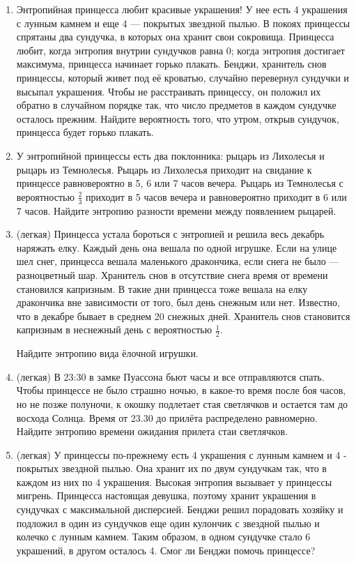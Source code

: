 \documentclass[a4paper,12pt]{article}
\begin{document}
\begin{enumerate} %
\item  %
Энтропийная принцесса любит красивые украшения! У нее есть 4 украшения с лунным камнем и еще 4 — покрытых звездной пылью.
В покоях принцессы спрятаны два сундучка, в которых она хранит свои сокровища.
Принцесса любит, когда энтропия внутрии сундучков равна 0;
когда энтропия достигает максимума, принцесса начинает горько плакать.
Бенджи, хранитель снов принцессы, который живет под её кроватью, случайно перевернул сундучки и высыпал украшения. Чтобы не расстраивать принцессу, он положил их обратно в случайном порядке так, что число предметов в каждом сундучке осталось прежним. Найдите вероятность того, что утром, открыв сундучок, принцесса будет горько плакать.
\item
У энтропийной принцессы есть два поклонника: рыцарь из Лихолесья и  рыцарь из Темнолесья. Рыцарь из Лихолесья приходит на свидание к принцессе равновероятно в 5, 6 или 7 часов вечера. Рыцарь из Темнолесья с вероятностью $\frac{2}{3}$ приходит в 5 часов вечера и равновероятно приходит в 6 или 7 часов. Найдите энтропию разности времени между появлением рыцарей.

\item (легкая)
Принцесса устала бороться с энтропией и решила весь декабрь наряжать елку.
Каждый день она вешала по одной игрушке.
Если на улице шел снег, принцесса вешала маленького дракончика, если снега не было — разноцветный шар.
Хранитель снов в отсутствие снега время от времени становился капризным.
В такие дни принцесса тоже вешала на елку дракончика вне зависимости от того, был день снежным или нет.
Известно, что в декабре бывает в среднем 20 снежных дней.
Хранитель снов становится капризным в неснежный день с вероятностью $\frac{1}{2}$.

Найдите энтропию вида ёлочной игрушки.
\item (легкая)
В 23:30 в замке Пуассона бьют часы и все отправляются спать.
Чтобы принцессе не было страшно ночью, в какое-то время после боя часов, но не позже полуночи,
к окошку подлетает стая светлячков и остается там до восхода Солнца. Время от 23.30 до прилёта распределено равномерно.
Найдите энтропию времени ожидания прилета стаи светлячков.

\item (легкая)
У принцессы по-прежнему есть  4 украшения с лунным камнем и 4 - покрытых звездной пылью. Она хранит их по двум сундучкам так, что в каждом из них по 4 украшения. Высокая энтропия вызывает у принцессы мигрень. Принцесса настоящая девушка, поэтому хранит украшения в сундучках с максимальной дисперсией. Бенджи решил порадовать хозяйку и подложил в один из сундучков еще один кулончик с звездной пылью и колечко с лунным камнем. Таким образом, в одном сундучке стало 6 украшений, в другом осталось 4. Смог ли Бенджи помочь принцессе?
\end{enumerate}
\end{document}
